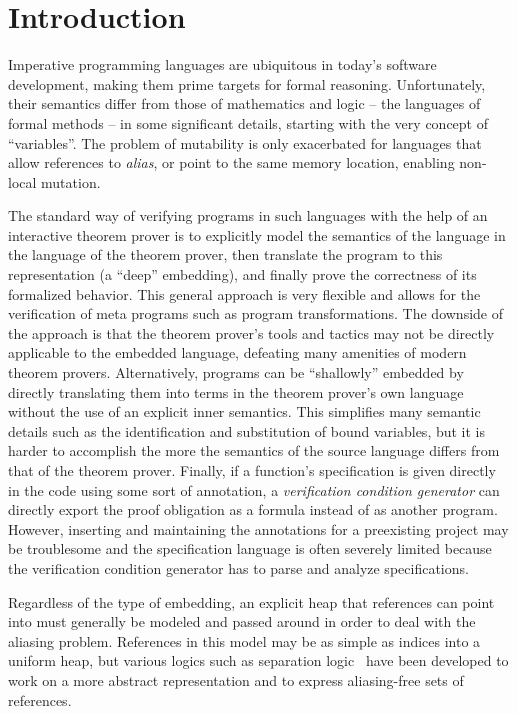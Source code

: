 \section{Introduction}

Imperative programming languages are ubiquitous in today's software development,
making them prime targets for formal reasoning. Unfortunately, their semantics
differ from those of mathematics and logic -- the languages of formal methods -- in some
significant details, starting with the very concept of ``variables''. The problem
of mutability is only exacerbated for languages that allow references to
\emph{alias}, or point to the same memory location, enabling non-local mutation.

The standard way of verifying programs in such languages with the help of an
interactive theorem prover is to explicitly model the semantics of the language
in the language of the theorem prover, then translate
the program to this representation (a ``deep'' embedding), and finally prove the
correctness of its formalized behavior. This general approach is very flexible
and allows for the verification of meta programs such as program transformations.
The downside of the approach is that the theorem prover's tools and tactics may
not be directly applicable to the embedded language, defeating many amenities of
modern theorem provers.
Alternatively, programs can be ``shallowly'' embedded by directly translating them
into terms in the theorem prover's own language without the use of an explicit inner semantics.
This simplifies many semantic details such as the identification and
substitution of bound variables, but it is harder to accomplish the more the semantics
of the source language differs from that of the theorem prover.
Finally, if a function's specification is given directly in the code using some
sort of annotation, a \emph{verification condition generator} can directly
export the proof obligation as a formula instead of as another program. However,
inserting and maintaining the annotations for a preexisting project may be
troublesome and the specification language is often severely limited because the
verification condition generator has to parse and analyze specifications.

Regardless of the type of embedding,
an explicit heap that references can point into must generally be modeled and
passed around in order to deal with the aliasing problem. References in this model may be as simple as
indices into a uniform heap, but various logics such as separation logic~\cite{reynolds2002separation} have been developed to work on a more abstract representation and to express
aliasing-free sets of references.

